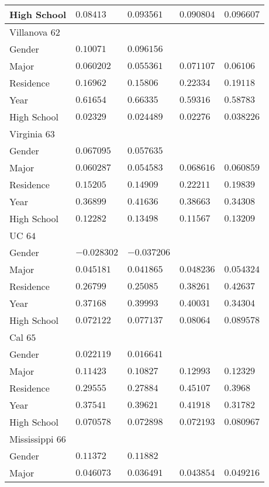 \begin{center}
\begin{longtable}{|l|l|l|l|l|}
High School & $0.08413$ & $0.093561$ & $0.090804$ & $0.096607$ \\ \hline \hline
Villanova $62$ & & &   \\ \hline
Gender & $0.10071$ & $0.096156$ & & \\
Major & $0.060202$ & $0.055361$ & $0.071107$ & $0.06106$ \\
Residence & $0.16962$ & $0.15806$ & $0.22334$ & $0.19118$ \\
Year & $0.61654$ & $0.66335$ & $0.59316$ & $0.58783$ \\
High School & $0.02329$ & $0.024489$ & $0.02276$ & $0.038226$ \\ \hline \hline
Virginia $63$ & & &   \\ \hline
Gender & $0.067095$ & $0.057635$ & & \\
Major & $0.060287$ & $0.054583$ & $0.068616$ & $0.060859$ \\
Residence & $0.15205$ & $0.14909$ & $0.22211$ & $0.19839$ \\
Year & $0.36899$ & $0.41636$ & $0.38663$ & $0.34308$ \\
High School & $0.12282$ & $0.13498$ & $0.11567$ & $0.13209$ \\ \hline \hline
UC $64$ & & &   \\ \hline
Gender & $-0.028302$ & $-0.037206$ & & \\
Major & $0.045181$ & $0.041865$ & $0.048236$ & $0.054324$ \\
Residence & $0.26799$ & $0.25085$ & $0.38261$ & $0.42637$ \\
Year & $0.37168$ & $0.39993$ & $0.40031$ & $0.34304$ \\
High School & $0.072122$ & $0.077137$ & $0.08064$ & $0.089578$ \\ \hline \hline
Cal $65$ & & &   \\ \hline
Gender & $0.022119$ & $0.016641$ & & \\
Major & $0.11423$ & $0.10827$ & $0.12993$ & $0.12329$ \\
Residence & $0.29555$ & $0.27884$ & $0.45107$ & $0.3968$ \\
Year & $0.37541$ & $0.39621$ & $0.41918$ & $0.31782$ \\
High School & $0.070578$ & $0.072898$ & $0.072193$ & $0.080967$ \\ \hline \hline
Mississippi $66$ & & &   \\ \hline
Gender & $0.11372$ & $0.11882$ & & \\
Major & $0.046073$ & $0.036491$ & $0.043854$ & $0.049216$ \\

\end{longtable}
\end{center}

